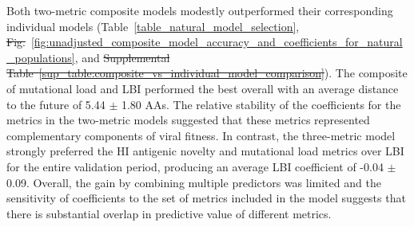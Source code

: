 \documentclass[9pt,lineno]{elife} %
\providecommand{\DIFadd}[1]{{\protect\color{blue}\uwave{#1}}} %
\providecommand{\DIFdel}[1]{{\protect\color{red}\sout{#1}}}                      %
\providecommand{\DIFaddbegin}{} %
\providecommand{\DIFaddend}{} %
\providecommand{\DIFdelbegin}{} %
\providecommand{\DIFdelend}{} %
\providecommand{\DIFaddtex}[1]{{\protect\color{blue}\uwave{#1}}} %
\providecommand{\DIFdeltex}[1]{{\protect\color{red}\sout{#1}}}                      %
\providecommand{\DIFaddbegin}{} %
\providecommand{\DIFaddend}{} %
\providecommand{\DIFdelbegin}{} %
\providecommand{\DIFdelend}{} %
\providecommand{\DIFadd}[1]{\texorpdfstring{\DIFaddtex{#1}}{#1}} %
\providecommand{\DIFdel}[1]{\texorpdfstring{\DIFdeltex{#1}}{}} %
\newcommand{\DIFscaledelfig}{0.5}
\newlength{\DIFdelgraphicswidth} %
\newlength{\DIFdelgraphicsheight} %
\newcommand{\DIFaddincludegraphics}[2][]{{\color{blue}\fbox{\DIFOincludegraphics[#1]{#2}}}} %
\newcommand{\DIFdelincludegraphics}[2][]{%
\sbox{\DIFdelgraphicsbox}{\DIFOincludegraphics[#1]{#2}}%
\settoboxwidth{\DIFdelgraphicswidth}{\DIFdelgraphicsbox} %
\settoboxtotalheight{\DIFdelgraphicsheight}{\DIFdelgraphicsbox} %
\scalebox{\DIFscaledelfig}{%
\parbox[b]{\DIFdelgraphicswidth}{\usebox{\DIFdelgraphicsbox}\\[-\baselineskip] \rule{\DIFdelgraphicswidth}{0em}}\llap{\resizebox{\DIFdelgraphicswidth}{\DIFdelgraphicsheight}{%
\setlength{\unitlength}{\DIFdelgraphicswidth}%
\begin{picture}(1,1)%
\thicklines\linethickness{2pt} %
{\color[rgb]{1,0,0}\put(0,0){\framebox(1,1){}}}%
{\color[rgb]{1,0,0}\put(0,0){\line( 1,1){1}}}%
{\color[rgb]{1,0,0}\put(0,1){\line(1,-1){1}}}%
\end{picture}%
}\hspace*{3pt}}} %
} %
\DeclareRobustCommand{\DIFaddbegin}{\DIFOaddbegin \let\includegraphics\DIFaddincludegraphics} %
\DeclareRobustCommand{\DIFaddend}{\DIFOaddend \let\includegraphics\DIFOincludegraphics} %
\DeclareRobustCommand{\DIFdelbegin}{\DIFOdelbegin \let\includegraphics\DIFdelincludegraphics} %
\DeclareRobustCommand{\DIFdelend}{\DIFOaddend \let\includegraphics\DIFOincludegraphics} %
\begin{document}
Both two-metric composite models modestly outperformed their corresponding individual models (Table~\ref{table_natural_model_selection}, \DIFdelbegin \DIFdel{Fig.}\DIFdelend \DIFaddbegin \DIFadd{Figure}\DIFaddend ~\ref{fig:unadjusted_composite_model_accuracy_and_coefficients_for_natural_populations}, and \DIFdelbegin \DIFdel{Supplemental Table~\ref{sup_table:composite_vs_individual_model_comparison}}\DIFdelend \DIFaddbegin \DIFadd{Table~\ref{table:composite_vs_individual_model_comparison}}\DIFaddend ).
The composite of mutational load and LBI performed the best overall with an average distance to the future of 5.44 $\pm$ 1.80 AAs.
The relative stability of the coefficients for the metrics in the two-metric models suggested that these metrics represented complementary components of viral fitness.
In contrast, the three-metric model strongly preferred the HI antigenic novelty and mutational load metrics over LBI for the entire validation period, producing an average LBI coefficient of -0.04 $\pm$ 0.09.
Overall, the gain by combining multiple predictors was limited and the sensitivity of coefficients to the set of metrics included in the model suggests that there is substantial overlap in predictive value of different metrics.
\end{document}
